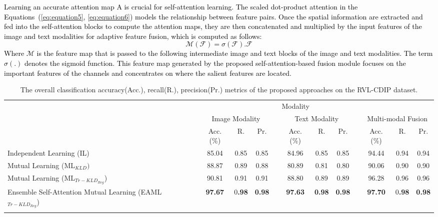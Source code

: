\documentclass[twocolumn]{svjour3}
\begin{document}
\textcolor{black}{Learning an accurate attention map $\mathrm{A}$ is crucial for self-attention learning. The scaled dot-product attention in the Equations~(\ref{eq:equation5}, \ref{eq:equation6}) models the relationship between feature pairs. Once the spatial information are extracted and fed into the self-attention blocks to compute the attention maps, they are then concatenated and multiplied by the input features of the image and text modalities for adaptive feature fusion, which is computed as follows:
\begin{equation}
    \mathcal{M}(\mathcal{F}) = \sigma(\mathcal{F}). \mathcal{F} 
    \label{eq:equation9}
\end{equation}
Where $\mathcal{M}$ is the feature map that is passed to the following intermediate image and text blocks of the image and text modalities. The term $\sigma(.)$ denotes the sigmoid function. This feature map generated by the proposed self-attention-based fusion module focuses on the important features of the channels and concentrates on where the salient features are located.
}
\setlength\tabcolsep{3 pt}
\begin{table*}[tbh]
\small
\centering
\caption{The overall classification accuracy(Acc.), recall(R.), precision(Pr.) metrics of the proposed approaches on the RVL-CDIP dataset.}
\resizebox{\textwidth}{!} {\begin{tabular}{lcccccccccccc}
    \hline\noalign{\smallskip}
     \multicolumn{1}{c}{} && \multicolumn{9}{c}{Modality} \\
         \noalign{\smallskip}\hline\noalign{\smallskip}
         \multicolumn{1}{c}{Method} && \multicolumn{3}{c}{Image Modality} && \multicolumn{3}{c}{Text Modality} && \multicolumn{3}{c}{Multi-modal Fusion} \\
         \noalign{\smallskip}\hline\noalign{\smallskip}
          && Acc.(\%) & R. & Pr. && Acc.(\%) & R. & Pr. && Acc.(\%) & R. & Pr.\\
         \cmidrule{3-5}\cmidrule{7-9}\cmidrule{11-13}
         Independent Learning (IL) && 85.04 & 0.85 & 0.85 && 84.96 & 0.85 & 0.85 && 94.44 & 0.94 & 0.94 \\
         Mutual Learning (ML$_{KLD})$ && 88.87 & 0.89 & 0.88 && 80.89 & 0.81 & 0.80 && 90.06 & 0.90 & 0.90 \\
         Mutual Learning (ML$_{{Tr-KLD}_{Reg}}$) && 90.81 & 0.91 & 0.91 && 88.80 & 0.89 & 0.89 && 96.28 & 0.96 & 0.96\\
         Ensemble Self-Attention Mutual Learning (EAML$_{{Tr-KLD}_{Reg}}$) && \textbf{97.67} & 0\textbf{.98} & \textbf{0.98} && \textbf{97.63} & \textbf{0.98} & \textbf{0.98} && \textbf{97.70} & 0\textbf{.98} & \textbf{0.98} \\
    \noalign{\smallskip}\hline
    \end{tabular}}
    \label{tab:proposedmethods}
\end{table*}
\end{document}
